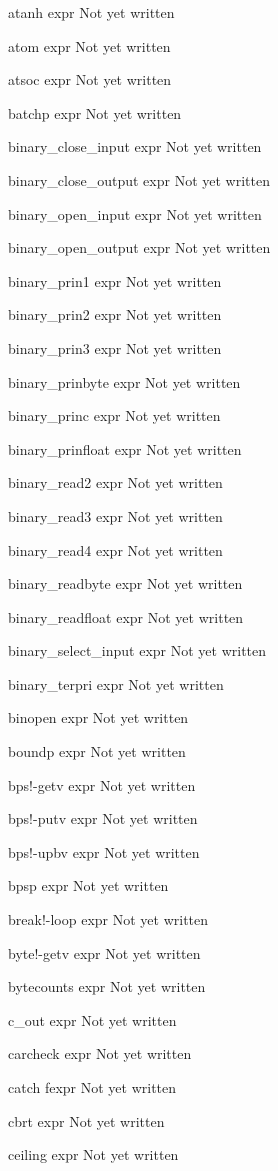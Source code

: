 \documentclass[a4paper,11pt]{article}
\begin{document}
\begin{description}
atanh expr
Not yet written

atom expr
Not yet written

atsoc expr
Not yet written

batchp expr
Not yet written

binary\_close\_input expr
Not yet written

binary\_close\_output expr
Not yet written

binary\_open\_input expr
Not yet written

binary\_open\_output expr
Not yet written

binary\_prin1 expr
Not yet written

binary\_prin2 expr
Not yet written

binary\_prin3 expr
Not yet written

binary\_prinbyte expr
Not yet written

binary\_princ expr
Not yet written

binary\_prinfloat expr
Not yet written

binary\_read2 expr
Not yet written

binary\_read3 expr
Not yet written

binary\_read4 expr
Not yet written

binary\_readbyte expr
Not yet written

binary\_readfloat expr
Not yet written

binary\_select\_input expr
Not yet written

binary\_terpri expr
Not yet written

binopen expr
Not yet written

boundp expr
Not yet written

bps!-getv expr
Not yet written

bps!-putv expr
Not yet written

bps!-upbv expr
Not yet written

bpsp expr
Not yet written

break!-loop expr
Not yet written

byte!-getv expr
Not yet written

bytecounts expr
Not yet written

c\_out expr
Not yet written

carcheck expr
Not yet written

catch fexpr
Not yet written

cbrt expr
Not yet written

ceiling expr
Not yet written


\end{description}
\end{document}
